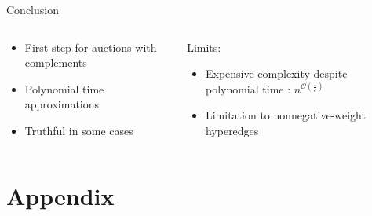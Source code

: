 \documentclass[aspectratio=169]{beamer}
\begin{document}
\begin{frame}{Conclusion}
    \begin{columns}
        \begin{column}{0.5\textwidth}
            \begin{itemize}
                \item First step for auctions with complements
                \item Polynomial time approximations
                \item Truthful in some cases
            \end{itemize}
        \end{column}
        \begin{column}{0.5\textwidth}
            Limits:
            \begin{itemize}
                \item Expensive complexity despite polynomial time : \(n^{\mathcal{O}\left(\frac{1}{\varepsilon}\right)}\)
                \item Limitation to nonnegative-weight hyperedges
            \end{itemize}
        \end{column}
    \end{columns}
\end{frame}

\appendix

{\section{Appendix}}
\end{document}
